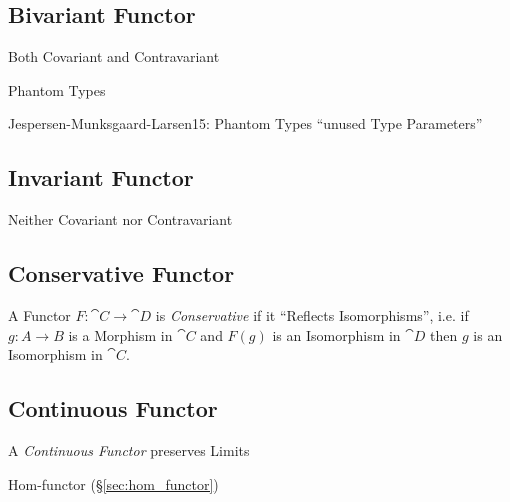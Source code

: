 \subsection{Bivariant Functor} \label{sec:bivariant_functor}

Both Covariant and Contravariant

Phantom Types %

Jespersen-Munksgaard-Larsen15: Phantom Types ``unused Type
Parameters''



\subsection{Invariant Functor} \label{sec:invariant_functor}

Neither Covariant nor Contravariant



\subsection{Conservative Functor}\label{sec:conservative_functor}

A Functor $F : \cat{C} \rightarrow \cat{D}$ is
\emph{Conservative} if it ``Reflects Isomorphisms'', i.e. if $g : A
\rightarrow B$ is a Morphism in $\cat{C}$ and $F(g)$ is an
Isomorphism in $\cat{D}$ then $g$ is an Isomorphism in
$\cat{C}$.



\subsection{Continuous Functor}\label{sec:continuous_functor}

A \emph{Continuous Functor} preserves Limits

Hom-functor (\S\ref{sec:hom_functor})



